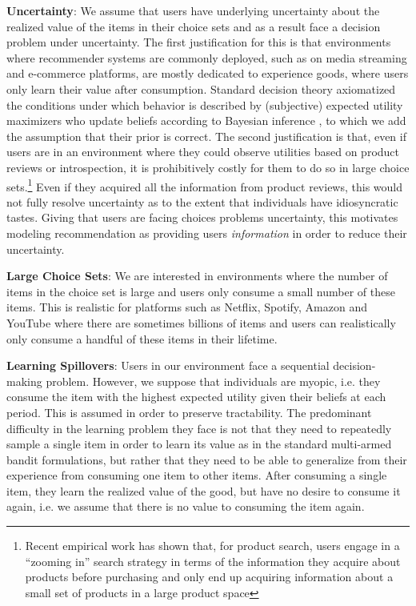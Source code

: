 \documentclass[sigconf]{acmart}
\begin{document}
\noindent \textbf{Uncertainty}: We assume that users have underlying uncertainty about the realized value of the items in their choice sets and as a result face a decision problem under uncertainty. The first justification for this is that environments where recommender systems are commonly deployed, such as on media streaming and e-commerce platforms, are mostly dedicated to experience goods, where users only learn their value after consumption. Standard decision theory axiomatized the conditions under which behavior is described by (subjective) expected utility maximizers \cite{savage1954} who update beliefs according to Bayesian inference \cite{ghirardato2002revisiting}, to which we add the assumption that their prior is correct. The second justification is that, even if users are in an environment where they could observe utilities based on product reviews or introspection, it is prohibitively costly for them to do so in large choice sets.\footnote{Recent empirical work \cite{bronnenberg2014zooming,hodgson2019horse} has shown that, for product search, users engage in a ``zooming in'' search strategy in terms of the information they acquire about products before purchasing and only end up acquiring information about a small set of products in a large product space}  Even if they acquired all the information from product reviews, this would not fully resolve uncertainty as to the extent that individuals have idiosyncratic tastes. Giving that users are facing choices problems uncertainty, this motivates modeling recommendation as providing users \textit{information} in order to reduce their uncertainty.
\par

\noindent \textbf{Large Choice Sets}: We are interested in environments where the number of items in the choice set is large and users only consume a small number of these items. This is realistic for platforms such as Netflix, Spotify, Amazon and YouTube where there are sometimes billions of items and users can realistically only consume a handful of these items in their lifetime.\par

\noindent \textbf{Learning Spillovers}: Users in our environment face a sequential decision-making problem. However, we suppose that individuals are myopic, i.e. they consume the item with the highest expected utility given their beliefs at each period. This is assumed in order to preserve tractability. The predominant difficulty in the learning problem they face is not that they need to repeatedly sample a single item in order to learn its value as in the standard multi-armed bandit formulations, but rather that they need to be able to generalize from their experience from consuming one item to other items. After consuming a single item, they learn the realized value of the good, but have no desire to consume it again, i.e. we assume that there is no value to consuming the item again.
\par
\end{document}
